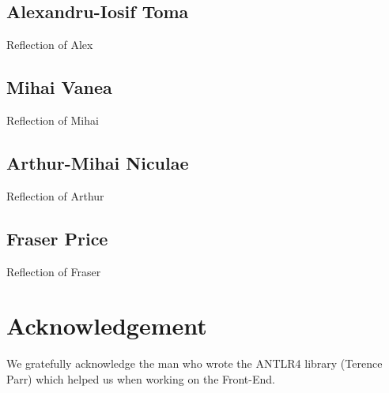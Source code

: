 \documentclass[11pt]{article}
\begin{document}
\subsection{Alexandru-Iosif Toma}
Reflection of Alex
\subsection{Mihai Vanea}
Reflection of Mihai
\subsection{Arthur-Mihai Niculae}
Reflection of Arthur
\subsection{Fraser Price}
Reflection of Fraser

\section{Acknowledgement}
We gratefully acknowledge the man who wrote the ANTLR4 library (Terence Parr)
which helped us when working on the Front-End.
\end{document}
